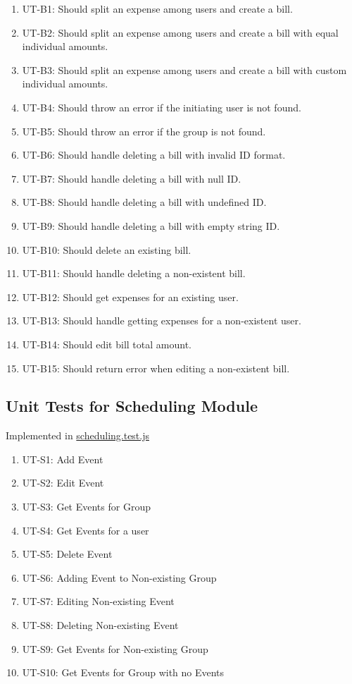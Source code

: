 \documentclass[12pt, titlepage]{article}
\begin{document}
\begin{enumerate}
    \item UT-B1: Should split an expense among users and create a bill.
    \item UT-B2: Should split an expense among users and create a bill with equal individual amounts.
    \item UT-B3: Should split an expense among users and create a bill with custom individual amounts.
    \item UT-B4: Should throw an error if the initiating user is not found.
    \item UT-B5: Should throw an error if the group is not found.
    \item UT-B6: Should handle deleting a bill with invalid ID format.
    \item UT-B7: Should handle deleting a bill with null ID.
    \item UT-B8: Should handle deleting a bill with undefined ID.
    \item UT-B9: Should handle deleting a bill with empty string ID.
    \item UT-B10: Should delete an existing bill.
    \item UT-B11: Should handle deleting a non-existent bill.
    \item UT-B12: Should get expenses for an existing user.
    \item UT-B13: Should handle getting expenses for a non-existent user.
    \item UT-B14: Should edit bill total amount.
    \item UT-B15: Should return error when editing a non-existent bill.
\end{enumerate}


\subsection{Unit Tests for Scheduling Module}

Implemented in \href{https://github.com/DangJustin/CapstoneProject/blob/main/src/rev0_demo/server/tests/scheduling.test.js}{scheduling.test.js}

\begin{enumerate}
    \item UT-S1: Add Event
    \item UT-S2: Edit Event
    \item UT-S3: Get Events for Group
    \item UT-S4: Get Events for a user
    \item UT-S5: Delete Event
    \item UT-S6: Adding Event to Non-existing Group
    \item UT-S7: Editing Non-existing Event
    \item UT-S8: Deleting Non-existing Event
    \item UT-S9: Get Events for Non-existing Group
    \item UT-S10: Get Events for Group with no Events
\end{enumerate}
\end{document}
